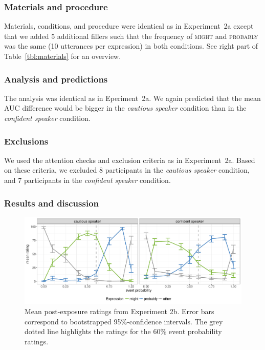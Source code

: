 \documentclass[man, floatsintext]{apa6}
\newcommand{\tableref}[1]{Table~\ref{#1}}
\begin{document}
\subsubsection{Materials and procedure}

Materials, conditions, and procedure were identical as in Experiment~2a except that we added 5 additional fillers such
that the frequency of \textsc{might} and \textsc{probably} was the same (10 utterances per expression) in both conditions. 
See right part of \tableref{tbl:materials} for an overview.

\subsubsection{Analysis and predictions}  

The analysis was identical as in Eperiment~2a. We again predicted that the mean AUC difference would be bigger in the 
\emph{cautious speaker} condition than in the \emph{confident speaker} condition.

\subsubsection{Exclusions} We used the attention checks and exclusion criteria as in Experiment~2a.  Based on these criteria, we excluded 8 participants in the \textit{cautious speaker} condition, and 7 participants in the \textit{confident speaker} condition.

\subsubsection{Results and discussion}

\begin{figure}
\includegraphics[width=\textwidth]{plots/exp-1-replication-ratings.pdf}
\caption{Mean post-exposure ratings from Experiment 2b. Error bars correspond to bootstrapped 95\%-confidence intervals.  The grey dotted line highlights the ratings for the 60\% event probability ratings. \label{fig:adaptation-results-prod2}}
\end{figure}
\end{document}
